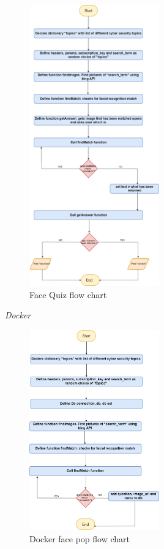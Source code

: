 \documentclass[12pt,a4paper]{article}
\begin{document}
\begin{figure}[h]
    \centering
    \includegraphics[width=0.5\textwidth]{Figs/Face_Quiz (1).png}
    \caption{Face Quiz flow chart} 
    \label{FaceQuiz}
\end{figure}    

\emph{Docker} 

\begin{figure}[h]
    \centering
    \includegraphics[width=0.5\textwidth]{Docker_face_pop.png} 
    \caption{Docker face pop flow chart}
\end{figure}   
\end{document}

